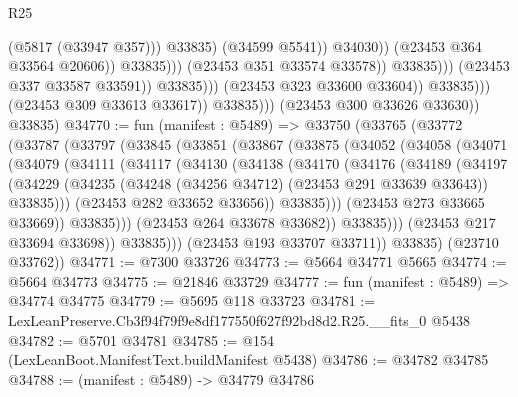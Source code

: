 \begin{lexlean}{R25}
\begin{coremodule}
                                                          (@5817 (@33947 @357)))
                                                        @33835)
                                                      (@34599 @5541))
                                                    @34030))
                                                (@23453 @364 @33564 @20606))
                                              @33835)))
                                        (@23453 @351 @33574 @33578))
                                      @33835)))
                                (@23453 @337 @33587 @33591))
                              @33835)))
                        (@23453 @323 @33600 @33604))
                      @33835)))
                (@23453 @309 @33613 @33617))
              @33835)))
        (@23453 @300 @33626 @33630))
      @33835)
@34770 := fun (manifest : @5489) =>
  @33750
    (@33765
      (@33772
        (@33787
          (@33797
            (@33845
              (@33851
                (@33867
                  (@33875
                    (@34052
                      (@34058
                        (@34071
                          (@34079
                            (@34111
                              (@34117
                                (@34130
                                  (@34138
                                    (@34170
                                      (@34176
                                        (@34189
                                          (@34197
                                            (@34229
                                              (@34235
                                                (@34248 (@34256 @34712) (@23453 @291 @33639 @33643))
                                                @33835)))
                                          (@23453 @282 @33652 @33656))
                                        @33835)))
                                  (@23453 @273 @33665 @33669))
                                @33835)))
                          (@23453 @264 @33678 @33682))
                        @33835)))
                  (@23453 @217 @33694 @33698))
                @33835)))
          (@23453 @193 @33707 @33711))
        @33835)
      (@23710 @33762))
@34771 := @7300 @33726
@34773 := @5664 @34771 @5665
@34774 := @5664 @34773
@34775 := @21846 @33729
@34777 := fun (manifest : @5489) => @34774 @34775
@34779 := @5695 @118 @33723
@34781 := LexLeanPreserve.Cb3f94f79f9e8df177550f627f92bd8d2.R25.__fits_0 @5438
@34782 := @5701 @34781
@34785 := @154 (LexLeanBoot.ManifestText.buildManifest @5438)
@34786 := @34782 @34785
@34788 := (manifest : @5489) -> @34779 @34786

\end{coremodule}
\end{lexlean}
